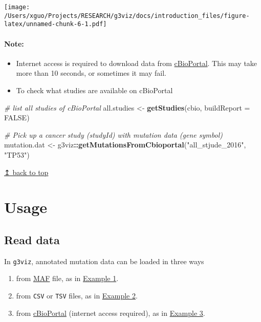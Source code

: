 \documentclass[
]{article}
\newenvironment{Shaded}{\begin{snugshade}}{\end{snugshade}}
\newcommand{\AttributeTok}[1]{\textcolor[rgb]{0.13,0.29,0.53}{#1}}
\newcommand{\CommentTok}[1]{\textcolor[rgb]{0.56,0.35,0.01}{\textit{#1}}}
\newcommand{\ConstantTok}[1]{\textcolor[rgb]{0.56,0.35,0.01}{#1}}
\newcommand{\FunctionTok}[1]{\textcolor[rgb]{0.13,0.29,0.53}{\textbf{#1}}}
\newcommand{\NormalTok}[1]{#1}
\newcommand{\OtherTok}[1]{\textcolor[rgb]{0.56,0.35,0.01}{#1}}
\newcommand{\SpecialCharTok}[1]{\textcolor[rgb]{0.81,0.36,0.00}{\textbf{#1}}}
\newcommand{\StringTok}[1]{\textcolor[rgb]{0.31,0.60,0.02}{#1}}
\providecommand{\tightlist}{%
  \setlength{\itemsep}{0pt}\setlength{\parskip}{0pt}}
\begin{document}
\texttt{[image: /Users/xguo/Projects/RESEARCH/g3viz/docs/introduction\_files/figure-latex/unnamed-chunk-6-1.pdf]}

\paragraph{Note:}\label{note}

\begin{itemize}
\tightlist
\item
  Internet access is required to download data from
  \href{http://www.cbioportal.org/}{cBioPortal}. This may take more than
  10 seconds, or sometimes it may fail.
\item
  To check what studies are available on cBioPortal
\end{itemize}

\begin{Shaded}
\begin{Highlighting}[]

\CommentTok{\# list all studies of cBioPortal}
\NormalTok{all.studies }\OtherTok{\textless{}{-}} \FunctionTok{getStudies}\NormalTok{(cbio, }\AttributeTok{buildReport =} \ConstantTok{FALSE}\NormalTok{)}

\CommentTok{\# Pick up a cancer study (studyId) with mutation data (gene symbol)}
\NormalTok{mutation.dat }\OtherTok{\textless{}{-}}\NormalTok{ g3viz}\SpecialCharTok{::}\FunctionTok{getMutationsFromCbioportal}\NormalTok{(}\StringTok{"all\_stjude\_2016"}\NormalTok{, }\StringTok{"TP53"}\NormalTok{)}
\end{Highlighting}
\end{Shaded}

\hyperref[top]{↥ back to top}

\section{Usage}\label{usage}

\subsection{Read data}\label{read-data}

In \texttt{g3viz}, annotated mutation data can be loaded in three ways

\begin{enumerate}
\def\labelenumi{\arabic{enumi}.}
\item
  from
  \href{https://docs.gdc.cancer.gov/Data/File_Formats/MAF_Format/}{MAF}
  file, as in \hyperref[ex1]{Example 1}.
\item
  from \texttt{CSV} or \texttt{TSV} files, as in \hyperref[ex2]{Example
  2}.
\item
  from \href{http://www.cbioportal.org/}{cBioPortal} (internet access
  required), as in \hyperref[ex3]{Example 3}.
\end{enumerate}
\end{document}
